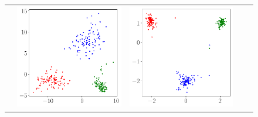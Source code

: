 \begin{figure}[ht]
{\begin{tabular}{m{.03\linewidth}*4{C}@{}}
            & \includegraphics[width=\linewidth]{figures/fc_penultimate_plot_1.pdf} 
            & \includegraphics[width=\linewidth]{figures/fc_penultimate_plot_3.pdf} 

\end{tabular}}
\end{figure}
